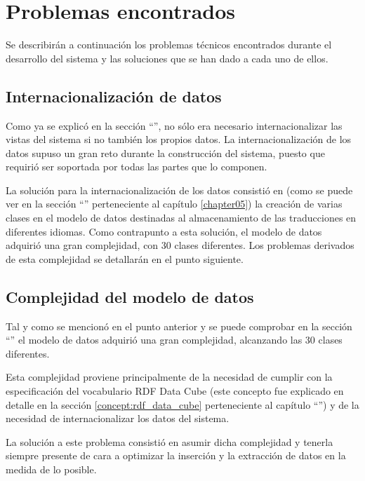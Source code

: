 \section{Problemas encontrados}
\label{implementacion:problemas_encontrados}
	
	Se describirán a continuación los problemas técnicos encontrados durante el desarrollo del sistema y las soluciones que se han dado a cada uno de ellos.
	
	\subsection{Internacionalización de datos}
	\label{implementacion:internacionalizacion_datos}
		
		Como ya se explicó en la sección ``'', no sólo era necesario internacionalizar las vistas del sistema si no también los propios datos.  La internacionalización de los datos supuso un gran reto durante la construcción del sistema, puesto que requirió ser soportada por todas las partes que lo componen.
		
		La solución para la internacionalización de los datos consistió en (como se puede ver en la sección ``'' perteneciente al capítulo \ref{chapter05}) la creación de varias clases en el modelo de datos destinadas al almacenamiento de las traducciones en diferentes idiomas.  Como contrapunto a esta solución, el modelo de datos adquirió una gran complejidad, con 30 clases diferentes.  Los problemas derivados de esta complejidad se detallarán en el punto siguiente.
	
	\subsection{Complejidad del modelo de datos}
	\label{implementacion:internacionalizacion_datos}
		
		Tal y como se mencionó en el punto anterior y se puede comprobar en la sección ``'' el modelo de datos adquirió una gran complejidad, alcanzando las 30 clases diferentes.
		
		Esta complejidad proviene principalmente de la necesidad de cumplir con la especificación del vocabulario RDF Data Cube (este concepto fue explicado en detalle en la sección \ref{concept:rdf_data_cube} perteneciente al capítulo ``'') y de la necesidad de internacionalizar los datos del sistema.
		
		La solución a este problema consistió en asumir dicha complejidad y tenerla siempre presente de cara a optimizar la inserción y la extracción de datos en la medida de lo posible.
		
